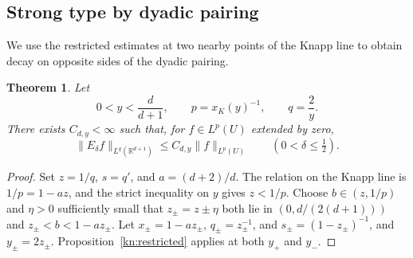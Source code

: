 \documentclass[11pt]{article}
\numberwithin{equation}{section}
\newtheorem{theorem}{Theorem}[section]
\newcommand{\R}{\mathbb{R}}
\newcommand{\norm}[1]{\lVert #1\rVert}
\begin{document}
\subsection{Strong type by dyadic pairing}

We use the restricted estimates at two nearby points of the Knapp
line to obtain decay on opposite sides of the dyadic pairing.

\begin{theorem}\label{kn:strong}
Let
\[
 0<y<\frac d{d+1},\qquad p=x_K(y)^{-1},\qquad q=\frac2y.
\]
There exists \(C_{d,y}<\infty\) such that, for \(f\in L^p(U)\)
extended by zero,
\[
 \norm{E_\delta f}_{L^q(\R^{d+1})}
    \le C_{d,y}\norm{f}_{L^p(U)}
 \qquad (0<\delta\le\tfrac12).
\]
\end{theorem}

\begin{proof}
Set \(z=1/q\), \(s=q'\), and \(a=(d+2)/d\). The relation on the
Knapp line is \(1/p=1-az\), and the strict inequality on \(y\) gives
\(z<1/p\). Choose \(b\in(z,1/p)\) and \(\eta>0\) sufficiently
small that \(z_\pm=z\pm\eta\) both lie in
\((0,d/(2(d+1)))\) and \(z_\pm<b<1-a z_\pm\). Let
\(x_\pm=1-a z_\pm\), \(q_\pm=z_\pm^{-1}\), and
\(s_\pm=(1-z_\pm)^{-1}\), and \(y_\pm=2z_\pm\).
Proposition~\ref{kn:restricted} applies at both \(y_+\) and \(y_-\).


\end{proof}
\end{document}
